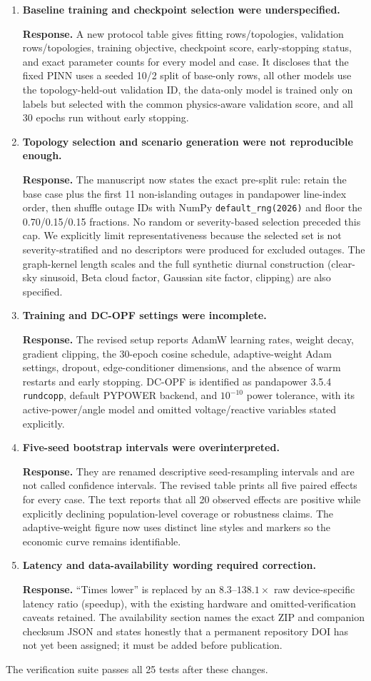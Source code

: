 \documentclass[11pt]{article}
\newcommand{\response}[1]{\par\noindent\textcolor{blue!55!black}{\textbf{Response.} #1}\par}
\begin{document}
\begin{enumerate}
\item \textbf{Baseline training and checkpoint selection were underspecified.}
\response{A new protocol table gives fitting rows/topologies, validation
rows/topologies, training objective, checkpoint score, early-stopping status,
and exact parameter counts for every model and case. It discloses that the
fixed PINN uses a seeded 10/2 split of base-only rows, all other models use the
topology-held-out validation ID, the data-only model is trained only on labels
but selected with the common physics-aware validation score, and all 30 epochs
run without early stopping.}

\item \textbf{Topology selection and scenario generation were not
reproducible enough.}
\response{The manuscript now states the exact pre-split rule: retain the base
case plus the first 11 non-islanding outages in pandapower line-index order,
then shuffle outage IDs with NumPy \texttt{default\_rng(2026)} and floor the
0.70/0.15/0.15 fractions. No random or severity-based selection preceded this
cap. We explicitly limit representativeness because the selected set is not
severity-stratified and no descriptors were produced for excluded outages.
The graph-kernel length scales and the full synthetic diurnal construction
(clear-sky sinusoid, Beta cloud factor, Gaussian site factor, clipping) are
also specified.}

\item \textbf{Training and DC-OPF settings were incomplete.}
\response{The revised setup reports AdamW learning rates, weight decay,
gradient clipping, the 30-epoch cosine schedule, adaptive-weight Adam settings,
dropout, edge-conditioner dimensions, and the absence of warm restarts and
early stopping. DC-OPF is identified as pandapower 3.5.4
\texttt{rundcopp}, default PYPOWER backend, and $10^{-10}$ power tolerance,
with its active-power/angle model and omitted voltage/reactive variables stated
explicitly.}

\item \textbf{Five-seed bootstrap intervals were overinterpreted.}
\response{They are renamed descriptive seed-resampling intervals and are not
called confidence intervals. The revised table prints all five paired effects
for every case. The text reports that all 20 observed effects are positive
while explicitly declining population-level coverage or robustness claims.
The adaptive-weight figure now uses distinct line styles and markers so the
economic curve remains identifiable.}

\item \textbf{Latency and data-availability wording required correction.}
\response{``Times lower'' is replaced by an
$8.3$--$138.1\times$ raw device-specific latency ratio (speedup), with the
existing hardware and omitted-verification caveats retained. The availability
section names the exact ZIP and companion checksum JSON and states honestly
that a permanent repository DOI has not yet been assigned; it must be added
before publication.}
\end{enumerate}

The verification suite passes all 25 tests after these changes.
\end{document}
